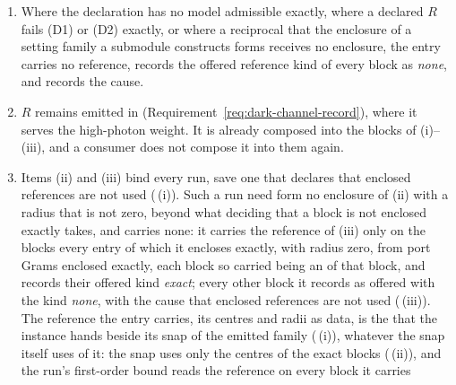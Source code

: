 \begin{requirement}
\begin{enumerate}[label=(\roman*),leftmargin=2.4em]
  submodule constructs, and Corollary~\ref{cor:exact-dark-composed}\,(i)). The reference is read against
  the  of the floating-point blocks of (i) in the same entry
  (): the same block kind and block
  identifiers, the photon numbers $n=0,\dots,N$ in increasing order, and
  within each block the occupation vectors in the one order in which the
  entry lists the floating-point blocks, which is also the order of the rows
  and columns of every centre and radius matrix. The entries of the reference
  that a snap treats as known to be exactly zero
  () are therefore exactly those enclosed as zero
  with radius zero.
\item Where the declaration has no model admissible exactly, where a declared
  $R$ fails (D1) or (D2) exactly, or where a reciprocal that the enclosure
  of a setting family a submodule constructs forms receives no enclosure, the
  entry carries no reference, records the offered reference kind of every
  block as \emph{none}, and records the cause.
\item $R$ remains emitted in 
  (Requirement~\ref{req:dark-channel-record}), where it serves the
  high-photon weight. It is already composed into the blocks of (i)--(iii),
  and a consumer does not compose it into them again.
\item Items (ii) and (iii) bind every run, save one that declares that
  enclosed references are not used
  (\,(i)). Such a run need form no
  enclosure of (ii) with a radius that is not zero, beyond what deciding that
  a block is not enclosed exactly takes, and carries none: it carries the
  reference of (iii) only on the blocks every entry of which it encloses
  exactly, with radius zero, from port Grams enclosed exactly, each block so
  carried being an  of that block, and records their
  offered kind \emph{exact}; every other block it records as offered with
  the kind \emph{none}, with the cause that enclosed references are not
  used (\,(iii)). The reference the entry
  carries, its centres and radii as data, is the 
  that the instance hands beside its snap of the emitted family
  (\,(i)), whatever the snap itself
  uses of it: the snap uses only the centres of the exact blocks
  (\,(ii)), and the run's first-order
  bound reads the reference on every block it carries

\end{enumerate}
\end{requirement}
